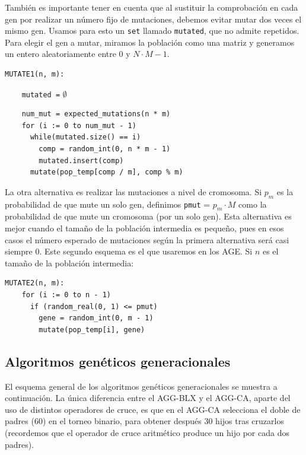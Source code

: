 \documentclass[12pt]{article}
\begin{document}
También es importante tener en cuenta que al sustituir la comprobación en cada gen por realizar un número fijo de mutaciones, debemos evitar mutar dos veces el mismo gen. Usamos para esto un \verb|set| llamado \verb|mutated|, que no admite repetidos. Para elegir el gen a mutar, miramos la población como una matriz y generamos un entero aleatoriamente entre $0$ y $N\cdot M - 1$.

\begin{verbatim}
MUTATE1(n, m):	
\end{verbatim} \vspace{-0.8em}\verb|    mutated =| $\emptyset$ \vspace{-0.5em}
\begin{verbatim}
    num_mut = expected_mutations(n * m)
    for (i := 0 to num_mut - 1) 
      while(mutated.size() == i) 
        comp = random_int(0, n * m - 1)
        mutated.insert(comp)
      mutate(pop_temp[comp / m], comp % m) 
\end{verbatim}

La otra alternativa es realizar las mutaciones a nivel de cromosoma. Si $p_m$ es la probabilidad de que mute un solo gen, definimos \verb|pmut| = $p_m \cdot M$ como la probabilidad de que mute un cromosoma (por un solo gen). Esta alternativa es mejor cuando el tamaño de la población intermedia es pequeño, pues en esos casos el número esperado de mutaciones según la primera alternativa será casi siempre $0$. Este segundo esquema es el que usaremos en los AGE. Si $n$ es el tamaño de la población intermedia:

\begin{verbatim}
MUTATE2(n, m):
    for (i := 0 to n - 1)
      if (random_real(0, 1) <= pmut)
        gene = random_int(0, m - 1)
        mutate(pop_temp[i], gene)
\end{verbatim}

\subsection*{Algoritmos genéticos generacionales}
\label{agg}

El esquema general de los algoritmos genéticos generacionales se muestra a continuación. La única diferencia entre el AGG-BLX y el AGG-CA, aparte del uso de distintos operadores de cruce, es que en el AGG-CA selecciona el doble de padres (60) en el torneo binario, para obtener después 30 hijos tras cruzarlos (recordemos que el operador de cruce aritmético produce un hijo por cada dos padres).\\
\end{document}
